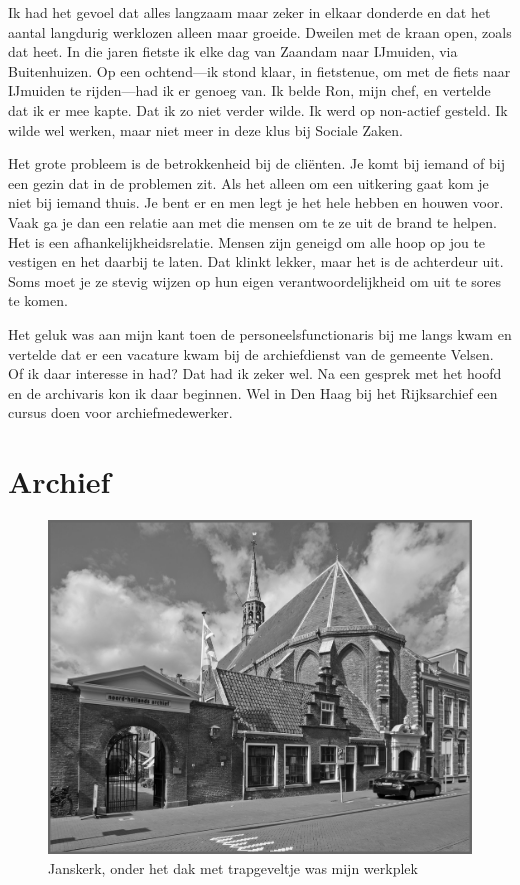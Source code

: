 \documentclass[10pt,twoside, openright]{memoir}
\begin{document}
Ik had het gevoel dat alles langzaam maar zeker in elkaar donderde en dat het aantal langdurig werklozen alleen maar groeide. Dweilen met de kraan open, zoals dat heet. In die jaren fietste ik elke dag van Zaandam naar IJmuiden, via Buitenhuizen. Op een ochtend---ik stond klaar, in fietstenue, om met de fiets naar IJmuiden te rijden---had ik er genoeg van. Ik belde Ron, mijn chef, en vertelde dat ik er mee kapte. Dat ik zo niet verder wilde. Ik werd op non-actief gesteld. Ik wilde wel werken, maar niet meer in deze klus bij Sociale Zaken.

Het grote probleem is de betrokkenheid bij de cliënten. Je komt bij iemand of bij een gezin dat in de problemen zit. Als het alleen om een uitkering gaat kom je niet bij iemand thuis. Je bent er en men legt je het hele hebben en houwen voor. Vaak ga je dan een relatie aan met die mensen om te ze uit de brand te helpen. Het is een afhankelijkheidsrelatie. Mensen zijn geneigd om alle hoop op jou te vestigen en het daarbij te laten. Dat klinkt lekker, maar het is de achterdeur uit. Soms moet je ze stevig wijzen op hun eigen verantwoordelijkheid om uit te sores te komen. 

Het geluk was aan mijn kant toen de personeelsfunctionaris bij me langs kwam en vertelde dat er een vacature kwam bij de archiefdienst van de gemeente Velsen. Of ik daar interesse in had? Dat had ik zeker wel. Na een gesprek met het hoofd en de archivaris kon ik daar beginnen. Wel in Den Haag bij het Rijksarchief een cursus doen voor archiefmedewerker. 

\section{Archief} %
\label{cha:archief}

\begin{figure}
\includegraphics[width=\textwidth]{img/285Janskerk.jpg}
\caption*{\footnotesize Janskerk, onder het dak met trapgeveltje was mijn werkplek}
\end{figure}
\end{document}
